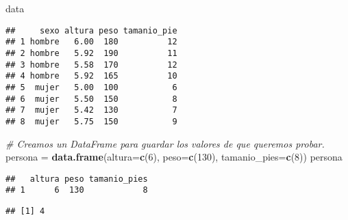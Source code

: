 \documentclass[]{article}
\newenvironment{Shaded}{\begin{snugshade}}{\end{snugshade}}
\newcommand{\KeywordTok}[1]{\textcolor[rgb]{0.13,0.29,0.53}{\textbf{#1}}}
\newcommand{\DataTypeTok}[1]{\textcolor[rgb]{0.13,0.29,0.53}{#1}}
\newcommand{\DecValTok}[1]{\textcolor[rgb]{0.00,0.00,0.81}{#1}}
\newcommand{\StringTok}[1]{\textcolor[rgb]{0.31,0.60,0.02}{#1}}
\newcommand{\CommentTok}[1]{\textcolor[rgb]{0.56,0.35,0.01}{\textit{#1}}}
\newcommand{\OperatorTok}[1]{\textcolor[rgb]{0.81,0.36,0.00}{\textbf{#1}}}
\newcommand{\NormalTok}[1]{#1}
\begin{document}
\begin{Shaded}
\begin{Highlighting}[]
\NormalTok{data}
\end{Highlighting}
\end{Shaded}

\begin{verbatim}
##     sexo altura peso tamanio_pie
## 1 hombre   6.00  180          12
## 2 hombre   5.92  190          11
## 3 hombre   5.58  170          12
## 4 hombre   5.92  165          10
## 5  mujer   5.00  100           6
## 6  mujer   5.50  150           8
## 7  mujer   5.42  130           7
## 8  mujer   5.75  150           9
\end{verbatim}

\begin{Shaded}
\begin{Highlighting}[]
\CommentTok{# Creamos un DataFrame para guardar los valores de que queremos probar.}
\NormalTok{persona =}\StringTok{ }\KeywordTok{data.frame}\NormalTok{(}\DataTypeTok{altura=}\KeywordTok{c}\NormalTok{(}\DecValTok{6}\NormalTok{),}
                     \DataTypeTok{peso=}\KeywordTok{c}\NormalTok{(}\DecValTok{130}\NormalTok{),}
                     \DataTypeTok{tamanio_pies=}\KeywordTok{c}\NormalTok{(}\DecValTok{8}\NormalTok{))}
\NormalTok{persona}
\end{Highlighting}
\end{Shaded}

\begin{verbatim}
##   altura peso tamanio_pies
## 1      6  130            8
\end{verbatim}

\begin{Shaded}
\end{Shaded}

\begin{verbatim}
## [1] 4
\end{verbatim}

\begin{Shaded}
\end{Shaded}
\end{document}
